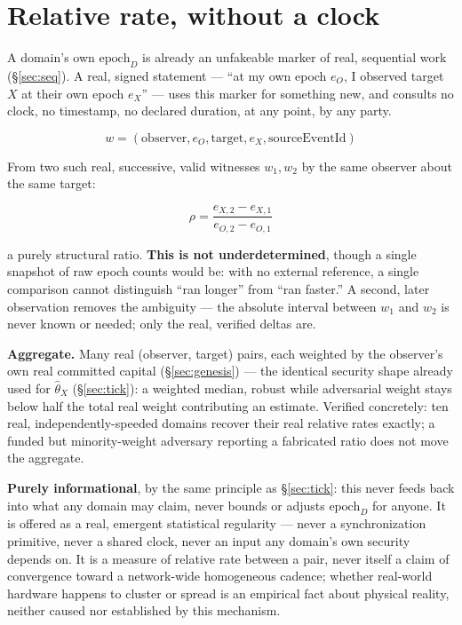 \documentclass[10pt]{article}
\begin{document}
\section{Relative rate, without a clock}
\label{sec:rate}

A domain's own $\mathrm{epoch}_D$ is already an unfakeable marker of real, sequential work (\S\ref{sec:seq}). A real, signed statement --- ``at my own epoch $e_O$, I observed target $X$ at their own epoch $e_X$'' --- uses this marker for something new, and consults no clock, no timestamp, no declared duration, at any point, by any party.

\[
w = (\mathrm{observer}, e_O, \mathrm{target}, e_X, \mathrm{sourceEventId})
\]

From two such real, successive, valid witnesses $w_1, w_2$ by the same observer about the same target:

\[
\rho = \frac{e_{X,2} - e_{X,1}}{e_{O,2} - e_{O,1}}
\]

a purely structural ratio. \textbf{This is not underdetermined}, though a single snapshot of raw epoch counts would be: with no external reference, a single comparison cannot distinguish ``ran longer'' from ``ran faster.'' A second, later observation removes the ambiguity --- the absolute interval between $w_1$ and $w_2$ is never known or needed; only the real, verified deltas are.

\textbf{Aggregate.} Many real (observer, target) pairs, each weighted by the observer's own real committed capital (\S\ref{sec:genesis}) --- the identical security shape already used for $\hat\theta_X$ (\S\ref{sec:tick}): a weighted median, robust while adversarial weight stays below half the total real weight contributing an estimate. Verified concretely: ten real, independently-speeded domains recover their real relative rates exactly; a funded but minority-weight adversary reporting a fabricated ratio does not move the aggregate.

\textbf{Purely informational}, by the same principle as \S\ref{sec:tick}: this never feeds back into what any domain may claim, never bounds or adjusts $\mathrm{epoch}_D$ for anyone. It is offered as a real, emergent statistical regularity --- never a synchronization primitive, never a shared clock, never an input any domain's own security depends on. It is a measure of relative rate between a pair, never itself a claim of convergence toward a network-wide homogeneous cadence; whether real-world hardware happens to cluster or spread is an empirical fact about physical reality, neither caused nor established by this mechanism.
\end{document}
